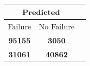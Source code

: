 \begin{tabular} 
 {@{}ccc@{}} 
\toprule 
\multicolumn{2}{c}{\textbf{Predicted}}
 \\ \midrule 
\multicolumn{1}{|c|}{Failure} & 
\multicolumn{1}{c|}{No Failure}
 \\ \midrule 
\multicolumn{1}{|c|}{\color{green}\textbf{95155}} & 
\multicolumn{1}{c|}{\color{red}\textbf{3050}}
 \\ \midrule 
\multicolumn{1}{|c|}{\color{red}\textbf{31061}} & 
\multicolumn{1}{c|}{\color{green}\textbf{40862}}
 \\ \bottomrule 
\end{tabular} 
